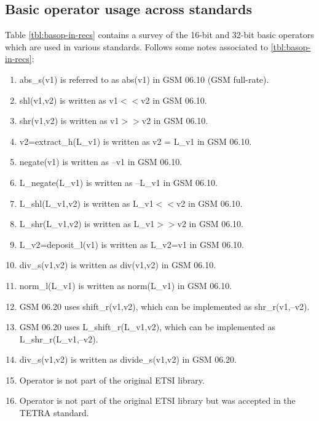 \subsection{Basic operator usage across standards}

Table \ref{tbl:basop-in-recs} contains a survey of the 16-bit and 32-bit basic operators which are used in various standards.
Follows some notes associated to \ref{tbl:basop-in-recs}:

\begin{enumerate}
    \item abs\_s(v1) is referred to as abs(v1) in GSM 06.10 (GSM full-rate).
    \item shl(v1,v2) is written as v1$<<$v2 in GSM 06.10.
    \item shr(v1,v2) is written as v1$>>$v2 in GSM 06.10.
    \item v2=extract\_h(L\_v1) is written as v2 = L\_v1 in GSM 06.10.
    \item negate(v1) is written as --v1 in GSM 06.10.
    \item L\_negate(L\_v1) is written as --L\_v1 in GSM 06.10.
    \item L\_shl(L\_v1,v2) is written as L\_v1$<<$v2 in GSM 06.10.
    \item L\_shr(L\_v1,v2) is written as L\_v1$>>$v2 in GSM 06.10.
    \item L\_v2=deposit\_l(v1) is written as L\_v2=v1 in GSM 06.10.
    \item div\_s(v1,v2) is written as div(v1,v2) in GSM 06.10.
    \item norm\_l(L\_v1) is written as norm(L\_v1) in GSM 06.10.
    \item GSM 06.20 uses shift\_r(v1,v2), which can be implemented
    as shr\_r(v1,--v2).
    \item GSM 06.20 uses L\_shift\_r(L\_v1,v2), which can be
    implemented as L\_shr\_r(L\_v1,--v2).
    \item div\_s(v1,v2) is written as divide\_s(v1,v2) in GSM 06.20.
    \item Operator is not part of the original ETSI library.
    \item Operator is not part of the original ETSI library but was
    accepted in the TETRA standard.
\end{enumerate}


